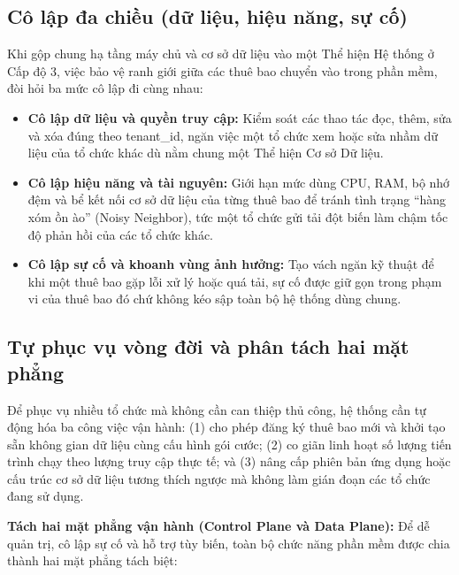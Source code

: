 \subsection{Cô lập đa chiều (dữ liệu, hiệu năng, sự cố)}\label{v4-sec-1-4-3}

Khi gộp chung hạ tầng máy chủ và cơ sở dữ liệu vào một Thể hiện Hệ thống ở Cấp độ 3, việc bảo vệ ranh giới giữa các thuê bao chuyển vào trong phần mềm, đòi hỏi ba mức cô lập đi cùng nhau:

\begin{itemize}
\item
  \textbf{Cô lập dữ liệu và quyền truy cập:} Kiểm soát các thao tác đọc, thêm, sửa và xóa đúng theo tenant\_\allowbreak{}id, ngăn việc một tổ chức xem hoặc sửa nhầm dữ liệu của tổ chức khác dù nằm chung một Thể hiện Cơ sở Dữ liệu.
\item
  \textbf{Cô lập hiệu năng và tài nguyên:} Giới hạn mức dùng CPU, RAM, bộ nhớ đệm và bể kết nối cơ sở dữ liệu của từng thuê bao để tránh tình trạng ``hàng xóm ồn ào'' (Noisy Neighbor), tức một tổ chức gửi tải đột biến làm chậm tốc độ phản hồi của các tổ chức khác.
\item
  \textbf{Cô lập sự cố và khoanh vùng ảnh hưởng:} Tạo vách ngăn kỹ thuật để khi một thuê bao gặp lỗi xử lý hoặc quá tải, sự cố được giữ gọn trong phạm vi của thuê bao đó chứ không kéo sập toàn bộ hệ thống dùng chung.
\end{itemize}

\subsection{Tự phục vụ vòng đời và phân tách hai mặt phẳng}\label{v4-sec-1-4-4}

Để phục vụ nhiều tổ chức mà không cần can thiệp thủ công, hệ thống cần tự động hóa ba công việc vận hành: (1) cho phép đăng ký thuê bao mới và khởi tạo sẵn không gian dữ liệu cùng cấu hình gói cước; (2) co giãn linh hoạt số lượng tiến trình chạy theo lượng truy cập thực tế; và (3) nâng cấp phiên bản ứng dụng hoặc cấu trúc cơ sở dữ liệu tương thích ngược mà không làm gián đoạn các tổ chức đang sử dụng.

\textbf{Tách hai mặt phẳng vận hành (Control Plane và Data Plane):} Để dễ quản trị, cô lập sự cố và hỗ trợ tùy biến, toàn bộ chức năng phần mềm được chia thành hai mặt phẳng tách biệt:

